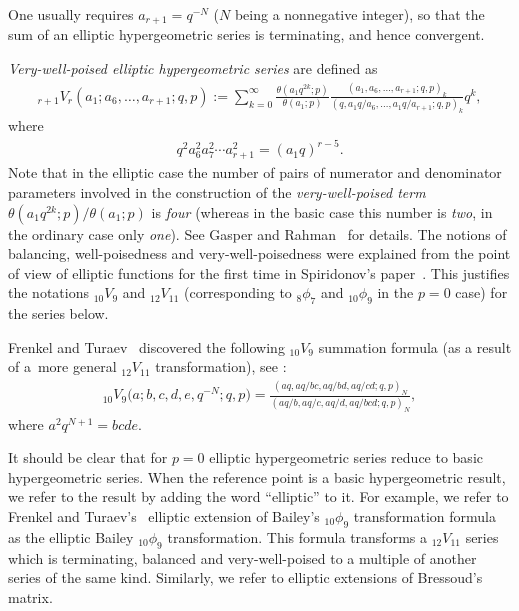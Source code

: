 \documentclass[pdftex]{sigma}
\numberwithin{equation}{section}
\newcommand{\elliptictheta}[1]{\theta \left({#1} ; p\right) }
\begin{document}
One usually requires $a_{r+1}=q^{-N}$ ($N$ being a nonnegative integer), so that the sum of an elliptic hypergeometric series is terminating, and hence convergent.

{\em Very-well-poised elliptic hypergeometric series} are def\/ined as
\begin{gather*}%
{}_{r+1}V_r(a_1;a_6,\dots,a_{r+1};q,p):=
\sum_{k=0}^{\infty}\frac{\elliptictheta{a_1q^{2k}}}{\elliptictheta{a_1}}
\frac{(a_1,a_6,\dots,a_{r+1};q,p)_k}
{(q,a_1q/a_6,\dots,a_1q/a_{r+1};q,p)_k}q^k,
\end{gather*}
where
\begin{gather*}
q^2a_6^2a_7^2\cdots a_{r+1}^2=(a_1q)^{r-5}.
\end{gather*}
Note that in the elliptic case the number of pairs of numerator and denominator parameters involved in the construction of the {\em very-well-poised term} $\theta(a_1q^{2k};p)/\theta(a_1;p)$ is {\em four} (whereas in the basic case this number is {\em two}, in the ordinary case only {\em one}).
See Gasper and Rahman~\cite[Chapter~11]{GR90} for details. The notions of balancing, well-poisedness and very-well-poisedness were explained from the point of view of elliptic functions for the first time in Spiridonov's paper~\cite{VPS2002b}. This justifies the notations ${}_{10}V_9$ and ${}_{12}V_{11}$ (corresponding to ${}_8\phi_7$ and ${}_{10}\phi_9$ in the $p=0$ case) for the series below.

Frenkel and Turaev~\cite{FT1997} discovered the following $_{10}V_9$ summation formula (as a result of a~more general ${}_{12}V_{11}$ transformation), see \cite[equation~(11.4.1)]{GR90}:
\begin{gather}\label{10V9}
{}_{10}V_9\big(a;b,c,d,e,q^{-N};q,p\big) =\frac {(aq,aq/bc,aq/bd,aq/cd;q,p)_N} {(aq/b,aq/c,aq/d,aq/bcd;q,p)_N},
\end{gather}
where $a^2q^{N+1}=bcde$.

It should be clear that for $p=0$ elliptic hypergeometric series reduce to basic hypergeometric series. When the reference point is a basic hypergeometric result, we refer to the result by adding the word ``elliptic'' to it. For example, we refer to Frenkel and Turaev's~\cite{FT1997} elliptic extension of Bailey's $_{10}\phi_9$ transformation formula \cite[equation~(11.5.1)]{GR90} as the elliptic Bailey $_{10}\phi_9$ transformation. This formula transforms a $_{12}V_{11}$ series which is terminating, balanced and very-well-poised to a multiple of another series of the same kind. Similarly, we refer to elliptic extensions of Bressoud's matrix.
\end{document}
